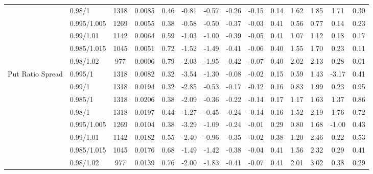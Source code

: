 \begin{tabular}{llcccccccccccc}
 & 0.98/1 & 1318 & 0.0085 & 0.46 & -0.81 & -0.57 & -0.26 & -0.15 & 0.14 & 1.62 & 1.85 & 1.71 & 0.30 \\
 & 0.995/1.005 & 1269 & 0.0055 & 0.38 & -0.58 & -0.50 & -0.37 & -0.03 & 0.41 & 0.56 & 0.77 & 0.14 & 0.23 \\
 & 0.99/1.01 & 1142 & 0.0064 & 0.59 & -1.03 & -1.00 & -0.39 & -0.05 & 0.41 & 1.07 & 1.12 & 0.18 & 0.17 \\
 & 0.985/1.015 & 1045 & 0.0051 & 0.72 & -1.52 & -1.49 & -0.41 & -0.06 & 0.40 & 1.55 & 1.70 & 0.23 & 0.11 \\
 & 0.98/1.02 & 977 & 0.0006 & 0.79 & -2.03 & -1.95 & -0.42 & -0.07 & 0.40 & 2.02 & 2.13 & 0.28 & 0.01 \\
Put Ratio Spread & 0.995/1 & 1318 & 0.0082 & 0.32 & -3.54 & -1.30 & -0.08 & -0.02 & 0.15 & 0.59 & 1.43 & -3.17 & 0.41 \\
 & 0.99/1 & 1318 & 0.0194 & 0.32 & -2.85 & -0.53 & -0.17 & -0.12 & 0.16 & 0.83 & 1.99 & 0.23 & 0.95 \\
 & 0.985/1 & 1318 & 0.0206 & 0.38 & -2.09 & -0.36 & -0.22 & -0.14 & 0.17 & 1.17 & 1.63 & 1.37 & 0.86 \\
 & 0.98/1 & 1318 & 0.0197 & 0.44 & -1.27 & -0.45 & -0.24 & -0.14 & 0.16 & 1.52 & 2.19 & 1.76 & 0.72 \\
 & 0.995/1.005 & 1269 & 0.0104 & 0.38 & -3.29 & -1.09 & -0.24 & -0.01 & 0.29 & 0.80 & 1.68 & -1.00 & 0.43 \\
 & 0.99/1.01 & 1142 & 0.0182 & 0.55 & -2.40 & -0.96 & -0.35 & -0.02 & 0.38 & 1.20 & 2.46 & 0.22 & 0.53 \\
 & 0.985/1.015 & 1045 & 0.0176 & 0.68 & -1.49 & -1.42 & -0.38 & -0.04 & 0.41 & 1.56 & 2.32 & 0.29 & 0.41 \\
 & 0.98/1.02 & 977 & 0.0139 & 0.76 & -2.00 & -1.83 & -0.41 & -0.07 & 0.41 & 2.01 & 3.02 & 0.38 & 0.29 \\
\bottomrule
\end{tabular}
